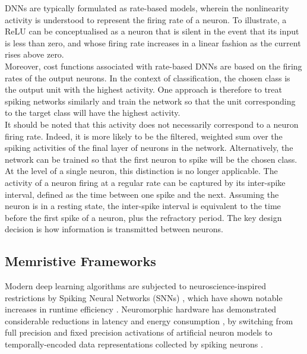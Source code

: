 \noindent DNNs are typically formulated as rate-based models, wherein the nonlinearity activity is understood to represent the firing rate of a neuron. To illustrate, a ReLU can be conceptualised as a neuron that is silent in the event that its input is less than zero, and whose firing rate increases in a linear fashion as the current rises above zero. \\

\noindent Moreover, cost functions associated with rate-based DNNs are based on the firing rates of the output neurons. In the context of classification, the chosen class is the output unit with the highest activity. One approach is therefore to treat spiking networks similarly and train the network so that the unit corresponding to the target class will have the highest activity. \\

\noindent It should be noted that this activity does not necessarily correspond to a neuron firing rate. Indeed, it is more likely to be the filtered, weighted sum over the spiking activities of the final layer of neurons in the network. Alternatively, the network can be trained so that the first neuron to spike will be the chosen class.\\

\noindent At the level of a single neuron, this distinction is no longer applicable. The activity of a neuron firing at a regular rate can be captured by its inter-spike interval, defined as the time between one spike and the next. Assuming the neuron is in a resting state, the inter-spike interval is equivalent to the time before the first spike of a neuron, plus the refractory period. The key design decision is how information is transmitted between neurons.

\subsection[Memristive Frameworks]{Memristive Frameworks}

\noindent Modern deep learning algorithms are subjected to neuroscience-inspired restrictions by Spiking Neural Networks (SNNs) \cite{tavanaei2019deep}, which have shown notable increases in runtime efficiency \cite{wang2020supervised}. Neuromorphic hardware has demonstrated considerable reductions in latency and energy consumption \cite{wunderlich2019demonstrating}, by switching from full precision and fixed precision activations of artificial neuron models to temporally-encoded data representations collected by spiking neurons \cite{zhou2020towards}.\\

